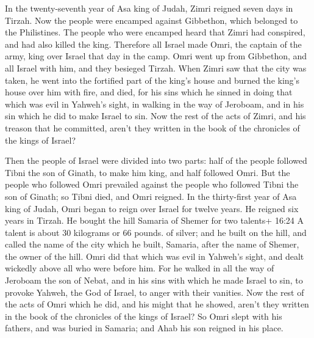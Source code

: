  In the twenty-seventh year of Asa king of Judah, Zimri
reigned seven days in Tirzah. Now the people were encamped against
Gibbethon, which belonged to the Philistines.  The people
who were encamped heard that Zimri had conspired, and had also killed
the king. Therefore all Israel made Omri, the captain of the army, king
over Israel that day in the camp.  Omri went up from
Gibbethon, and all Israel with him, and they besieged Tirzah.
 When Zimri saw that the city was taken, he went into the
fortified part of the king's house and burned the king's house over him
with fire, and died,  for his sins which he sinned in doing
that which was evil in Yahweh's sight, in walking in the way of
Jeroboam, and in his sin which he did to make Israel to sin.
 Now the rest of the acts of Zimri, and his treason that he
committed, aren't they written in the book of the chronicles of the
kings of Israel?

 Then the people of Israel were divided into two parts:
half of the people followed Tibni the son of Ginath, to make him king,
and half followed Omri.  But the people who followed Omri
prevailed against the people who followed Tibni the son of Ginath; so
Tibni died, and Omri reigned.  In the thirty-first year of
Asa king of Judah, Omri began to reign over Israel for twelve years. He
reigned six years in Tirzah.  He bought the hill Samaria of
Shemer for two talents+ 16:24 A talent is about 30 kilograms or 66
pounds. of silver; and he built on the hill, and called the name of the
city which he built, Samaria, after the name of Shemer, the owner of the
hill.  Omri did that which was evil in Yahweh's sight, and
dealt wickedly above all who were before him.  For he
walked in all the way of Jeroboam the son of Nebat, and in his sins with
which he made Israel to sin, to provoke Yahweh, the God of Israel, to
anger with their vanities.  Now the rest of the acts of
Omri which he did, and his might that he showed, aren't they written in
the book of the chronicles of the kings of Israel?  So Omri
slept with his fathers, and was buried in Samaria; and Ahab his son
reigned in his place.

